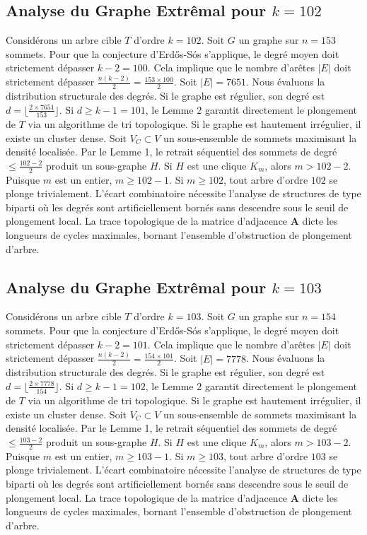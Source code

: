 \documentclass[11pt,a4paper]{article}
\begin{document}
\subsection{Analyse du Graphe Extr\^emal pour $k=102$}
Consid\'erons un arbre cible $T$ d'ordre $k=102$.
Soit $G$ un graphe sur $n=153$ sommets.
Pour que la conjecture d'Erd\H{o}s-S\'os s'applique, le degr\'e moyen doit strictement d\'epasser $k-2 = 100$.
Cela implique que le nombre d'ar\^etes $|E|$ doit strictement d\'epasser $\frac{n(k-2)}{2} = \frac{153 \times 100}{2}$.
Soit $|E| = 7651$.
Nous \'evaluons la distribution structurale des degr\'es. Si le graphe est r\'egulier, son degr\'e est $d = \lfloor \frac{2 \times 7651}{153} \rfloor$.
Si $d \geq k-1 = 101$, le Lemme 2 garantit directement le plongement de $T$ via un algorithme de tri topologique.
Si le graphe est hautement irr\'egulier, il existe un cluster dense. Soit $V_C \subset V$ un sous-ensemble de sommets maximisant la densit\'e localis\'ee.
Par le Lemme 1, le retrait s\'equentiel des sommets de degr\'e $\leq \frac{102-2}{2}$ produit un sous-graphe $H$.
Si $H$ est une clique $K_{m}$, alors $m > 102-2$. Puisque $m$ est un entier, $m \geq 102-1$. Si $m \geq 102$, tout arbre d'ordre $102$ se plonge trivialement.
L'\'ecart combinatoire n\'ecessite l'analyse de structures de type biparti o\`u les degr\'es sont artificiellement born\'es sans descendre sous le seuil de plongement local. La trace topologique de la matrice d'adjacence $\mathbf{A}$ dicte les longueurs de cycles maximales, bornant l'ensemble d'obstruction de plongement d'arbre.


\subsection{Analyse du Graphe Extr\^emal pour $k=103$}
Consid\'erons un arbre cible $T$ d'ordre $k=103$.
Soit $G$ un graphe sur $n=154$ sommets.
Pour que la conjecture d'Erd\H{o}s-S\'os s'applique, le degr\'e moyen doit strictement d\'epasser $k-2 = 101$.
Cela implique que le nombre d'ar\^etes $|E|$ doit strictement d\'epasser $\frac{n(k-2)}{2} = \frac{154 \times 101}{2}$.
Soit $|E| = 7778$.
Nous \'evaluons la distribution structurale des degr\'es. Si le graphe est r\'egulier, son degr\'e est $d = \lfloor \frac{2 \times 7778}{154} \rfloor$.
Si $d \geq k-1 = 102$, le Lemme 2 garantit directement le plongement de $T$ via un algorithme de tri topologique.
Si le graphe est hautement irr\'egulier, il existe un cluster dense. Soit $V_C \subset V$ un sous-ensemble de sommets maximisant la densit\'e localis\'ee.
Par le Lemme 1, le retrait s\'equentiel des sommets de degr\'e $\leq \frac{103-2}{2}$ produit un sous-graphe $H$.
Si $H$ est une clique $K_{m}$, alors $m > 103-2$. Puisque $m$ est un entier, $m \geq 103-1$. Si $m \geq 103$, tout arbre d'ordre $103$ se plonge trivialement.
L'\'ecart combinatoire n\'ecessite l'analyse de structures de type biparti o\`u les degr\'es sont artificiellement born\'es sans descendre sous le seuil de plongement local. La trace topologique de la matrice d'adjacence $\mathbf{A}$ dicte les longueurs de cycles maximales, bornant l'ensemble d'obstruction de plongement d'arbre.
\end{document}
